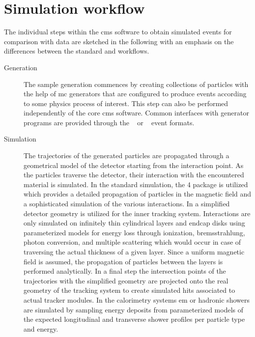 \section{Simulation workflow}
\label{sec:fsim-workflow}

The individual steps within the \gls{cms} software to obtain simulated events for comparison with data are sketched in the following with an emphasis on the differences between the standard and \FSIM workflows.

\begin{description}
\item[Generation] The sample generation commences by creating collections of particles with the help of \acrfull{mc} generators that are configured to produce events according to some physics process of interest. This step can also be performed independently of the core \gls{cms} software. Common interfaces with generator programs are provided through the \HEPMC[format=hyperbf]~\cite{Dobbs:2001ck} or \LHEF[format=hyperbf]~\cite{Alwall:2006yp} event formats.

\item[Simulation] The trajectories of the generated particles are propagated through a geometrical model of the detector starting from the interaction point. As the particles traverse the detector, their interaction with the encountered material is simulated. In the standard simulation, the \GEANT{}4 package is utilized which provides a detailed propagation of particles in the magnetic field and a sophisticated simulation of the various interactions. 
In \FSIM a simplified detector geometry is utilized for the inner tracking system. Interactions are only simulated on infinitely thin cylindrical layers and endcap disks using parameterized models for energy loss through ionization, bremsstrahlung, photon conversion, and multiple scattering which would occur in case of traversing the actual thickness of a given layer. Since a uniform magnetic field is assumed, the propagation of particles between the layers is performed analytically. In a final step the intersection points of the trajectories with the simplified geometry are projected onto the real geometry of the tracking system to create simulated hits associated to actual tracker modules. In the calorimetry systems \gls{em} or hadronic showers are simulated by sampling energy deposits from parameterized models of the expected longitudinal and transverse shower profiles per particle type and energy.


\end{description}
